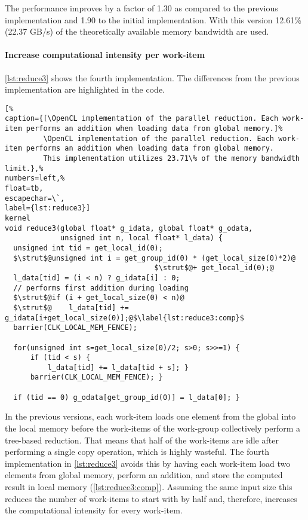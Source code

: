 The performance improves by a factor of 1.30 as compared to the previous implementation and 1.90 to the initial implementation.
With this version 12.61\% (22.37 GB/s) of the theoretically available memory bandwidth are used.



\FloatBarrier
\newpage

\paragraph{Increase computational intensity per work-item}

\autoref{lst:reduce3} shows the fourth implementation.
The differences from the previous implementation are highlighted in the code.
\begin{lstlisting}[%
caption={[\OpenCL implementation of the parallel reduction. Each work-item performs an addition when loading data from global memory.]%
         \OpenCL implementation of the parallel reduction. Each work-item performs an addition when loading data from global memory.
         This implementation utilizes 23.71\% of the memory bandwidth limit.},%
numbers=left,%
float=tb,
escapechar=\`,
label={lst:reduce3}]
kernel
void reduce3(global float* g_idata, global float* g_odata,
             unsigned int n, local float* l_data) {
  unsigned int tid = get_local_id(0);
  $\strut$@unsigned int i = get_group_id(0) * (get_local_size(0)*2)@
                                   $\strut$@+ get_local_id(0);@
  l_data[tid] = (i < n) ? g_idata[i] : 0;
  // performs first addition during loading
  $\strut$@if (i + get_local_size(0) < n)@
  $\strut$@    l_data[tid] += g_idata[i+get_local_size(0)];@$\label{lst:reduce3:comp}$
  barrier(CLK_LOCAL_MEM_FENCE);

  for(unsigned int s=get_local_size(0)/2; s>0; s>>=1) {
      if (tid < s) {
          l_data[tid] += l_data[tid + s]; }
      barrier(CLK_LOCAL_MEM_FENCE); }

  if (tid == 0) g_odata[get_group_id(0)] = l_data[0]; }
\end{lstlisting}

In the previous versions, each work-item loads one element from the global into the local memory before the work-items of the work-group collectively perform a tree-based reduction.
That means that half of the work-items are idle after performing a single copy operation, which is highly wasteful.
The fourth implementation in \autoref{lst:reduce3} avoids this by having each work-item load two elements from global memory, perform an addition, and store the computed result in local memory (\autoref{lst:reduce3:comp}).
Assuming the same input size this reduces the number of work-items to start with by half and, therefore, increases the computational intensity for every work-item.

